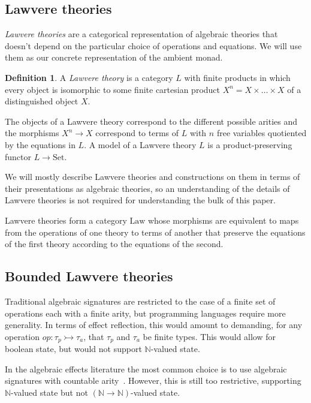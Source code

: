 \documentclass[acmsmall, screen, review, anonymous]{acmart}
\theoremstyle{definition}
\newtheorem{definition}{Definition}[section]
\newcommand{\nat}{\mathbb{N}}
\newcommand{\setc}{\mathrm{Set}}
\newcommand{\lawfc}{\mathrm{Law}}
\newcommand{\types}{\mathrel{:}}
\begin{document}
\subsection{Lawvere theories}

\emph{Lawvere theories} are a categorical representation of algebraic
theories that doesn't depend on the particular choice of operations and
equations. We will use them as our concrete representation of the
ambient monad.

\begin{definition}
  A \emph{Lawvere theory} is a category $L$ with finite products in
  which every object is isomorphic to some finite cartesian product
  $X^n = X \times \ldots \times X$ of a distinguished object $X$.
\end{definition}
The objects of a Lawvere theory correspond to the different possible
arities and the morphisms $X^n \rightarrow X$ correspond to terms
of $L$ with $n$ free variables quotiented by the equations in $L$. A
model of a Lawvere theory $L$ is a product-preserving functor
$L \rightarrow \setc$.

We will mostly describe Lawvere theories and constructions on them in
terms of their presentations as algebraic theories, so an understanding
of the details of Lawvere theories is not required for understanding the
bulk of this paper.

Lawvere theories form a category $\lawfc$ whose morphisms are equivalent
to maps from the operations of one theory to terms of another that
preserve the equations of the first theory according to the equations of
the second.

\subsection{Bounded Lawvere theories}
\label{sec:small}

Traditional algebraic signatures are restricted to the case of a finite
set of operations each with a finite arity, but programming languages
require more generality. In terms of effect reflection, this would
amount to demanding, for any operation
$op \types \tau_p \rightarrowtail \tau_a$, that $\tau_p$ and $\tau_a$ be
finite types. This would allow for boolean state, but would not support
$\nat$-valued state.

In the algebraic effects literature the most common choice is to use
algebraic signatures with countable
arity~\cite{power2006countable, hyland2007category}. However, this is still too
restrictive, supporting $\nat$-valued state but not
$(\nat \rightarrow \nat)$-valued state.
\end{document}
